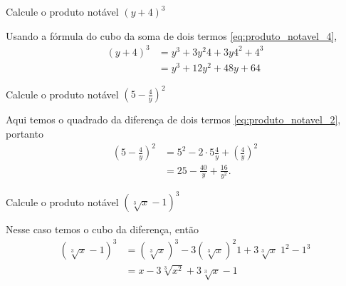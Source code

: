 \begin{example}
  Calcule o produto notável \((y+4)^3\)

  \solution
  Usando a fórmula do cubo da soma de dois termos
  \eqref{eq:produto_notavel_4},
  \begin{align*}
    (y+4)^3
    & = y^3 + 3 y^2 4 + 3 y 4^2 + 4^3 \\
    & = y^3 + 12y^2 + 48y + 64
  \end{align*}
\end{example}

\begin{example}
  Calcule o produto notável \(\left(5-\frac{4}{y}\right)^2\)

  \solution
  Aqui temos o quadrado da diferença de dois termos
  \eqref{eq:produto_notavel_2}, portanto
  \begin{align*}
    \left( 5 - \frac{4}{y} \right)^2
    & = 5^2 - 2 \cdot 5 \frac{4}{y} + \left(\frac{4}{y}\right)^2   \\[2mm]
    & = 25 - \frac{40}{y} + \frac{16}{y^2}.
  \end{align*}
\end{example}

\begin{example}
  Calcule o produto notável \(\left(\sqrt[3]{x}-1\right)^3\)

  \solution
  Nesse caso temos o cubo da diferença, então
  \begin{align*}
    \left( \sqrt[3]{x} - 1 \right)^3
    & = \left( \sqrt[3]{x} \right)^3
      - 3 \left( \sqrt[3]{x} \right)^2 1
      + 3 \sqrt[3]{x} \;1^2
      - 1^3                                        \\[2mm]
    & = x - 3\sqrt[3]{x^2}+  3 \sqrt[3]{x} - 1
  \end{align*}
\end{example}
